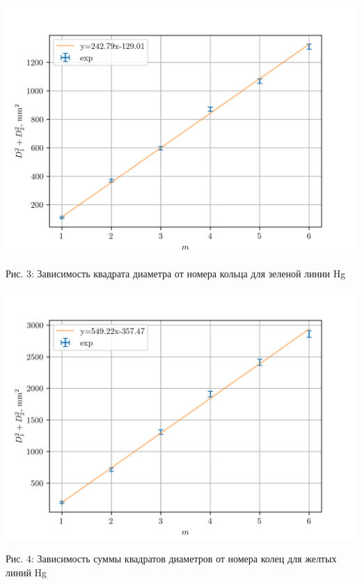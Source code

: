 \documentclass[12pt]{article}
\begin{document}
    \begin{minipage}{0.3\linewidth}
        \includegraphics[width=\linewidth]{pic/Hg_green}
        \caption{Рис. 3: Зависимость квадрата диаметра от номера кольца для зеленой линии Hg}
        \label{fig:fig3}
    \end{minipage}
    \hfill
    \begin{minipage}{0.3\linewidth}
        \includegraphics[width=\linewidth]{pic/Hg_yellow}
        \label{fig:fig4}
        \caption{Рис. 4: Зависимость суммы квадратов диаметров от номера колец для желтых линий Hg}
    \end{minipage}
    \hfill
\end{document}
